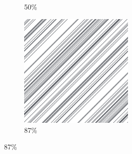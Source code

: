 \documentclass[12pt, fleqn]{report}                             %
\theoremstyle{break}                                            %
\begin{document}
\begin{figure}[ht!]
\begin{subfigure}[b]{0.4\linewidth}
          \caption{50\%}
        \end{subfigure}
        \begin{subfigure}[b]{0.4\linewidth}
          \includegraphics[width=0.6\textwidth]{Images/138/d.png}
          \caption{87\%}
        \end{subfigure}
      \end{figure}
\end{document}
